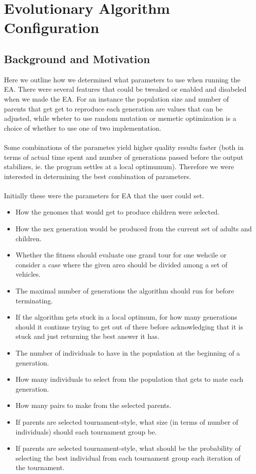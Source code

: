 \chapter{Evolutionary Algorithm Configuration} %
\label{cha:evolutionary_algorithm_configuration}

\section{Background and Motivation} %
\label{sec:background_and_motivation}
Here we outline how we determined what parameters to use when running the EA. There were several features that could be tweaked or enabled and disabeled when we made the EA. For an instance the population size and number of parents that get get to reproduce each generation are values that can be adjusted, while wheter to use random mutation or memetic optimization is a choice of whether to use one of two implementation.
\\\\
Some combinations of the parametes yield higher quality results faster (both in terms of actual time spent and number of generations passed before the output stabilizes, ie. the program settles at a local optimumum). Therefore we were interested in determining the best combination of parameters.
\\\\
Initially these were the parameters for EA that the user could set.
\begin{itemize}
	\item How the genomes that would get to produce children were selected.
	\item How the nex generation would be produced from the current set of adults and children.
	\item Whether the fitness should evaluate one grand tour for one wehcile or consider a case where the given area should be divided among a set of vehicles.
	\item The maximal number of generations the algorithm should run for before terminating.
	\item If the algorithm gets stuck in a local optimum, for how many generations should it continue trying to get out of there before acknowledging that it is stuck and just returning the best answer it has.
	\item The number of individuals to have in the population at the beginning of a generation.
	\item How many individuals to select from the population that gets to mate each generation.
	\item How many pairs to make from the selected parents.
	\item If parents are selected tournament-style, what size (in terms of number of individuals) should each tournament group be.
	\item If parents are selected tournament-style, what should be the probability of selecting the best individual from each tournament group each iteration of the tournament.

\end{itemize}


